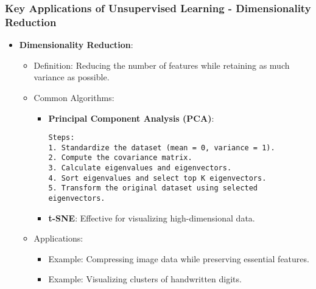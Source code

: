 \documentclass[aspectratio=169]{beamer}
\begin{document}
\begin{frame}[fragile]
    \frametitle{Key Applications of Unsupervised Learning - Dimensionality Reduction}
    \begin{itemize}
        \item \textbf{Dimensionality Reduction}:
        \begin{itemize}
            \item Definition: Reducing the number of features while retaining as much variance as possible.
            \item Common Algorithms:
            \begin{itemize}
                \item \textbf{Principal Component Analysis (PCA)}:
                \begin{lstlisting}
Steps:
1. Standardize the dataset (mean = 0, variance = 1).
2. Compute the covariance matrix.
3. Calculate eigenvalues and eigenvectors.
4. Sort eigenvalues and select top K eigenvectors.
5. Transform the original dataset using selected eigenvectors.
                \end{lstlisting}
                \item \textbf{t-SNE}: Effective for visualizing high-dimensional data.
            \end{itemize}
            \item Applications:
            \begin{itemize}
                \item Example: Compressing image data while preserving essential features.
                \item Example: Visualizing clusters of handwritten digits.
            \end{itemize}
        \end{itemize}
    \end{itemize}
\end{frame}
\end{document}
